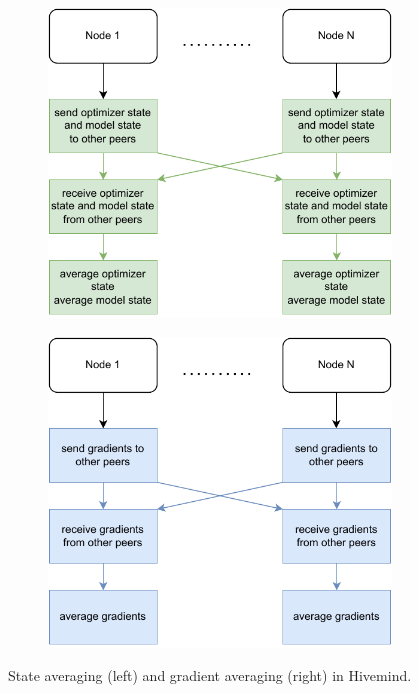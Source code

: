 \begin{figure}[h]
    \centering
    \begin{subfigure}[b]{0.475 \textwidth}
        \centering
        \caption{}
        \label{fig:state-averaging}
        \includegraphics[width=\textwidth]{./figures/02_optimizer_averaging.pdf}
    \end{subfigure}%
    \hfill
    \begin{subfigure}[b]{0.475 \textwidth}
        \centering
        \caption{}
        \label{fig:gradient-averaging}
        \includegraphics[width=\textwidth]{./figures/02_gradient_averaging.pdf}
    \end{subfigure}
    \caption{State averaging (left) and gradient averaging (right) in Hivemind.}
\end{figure}


